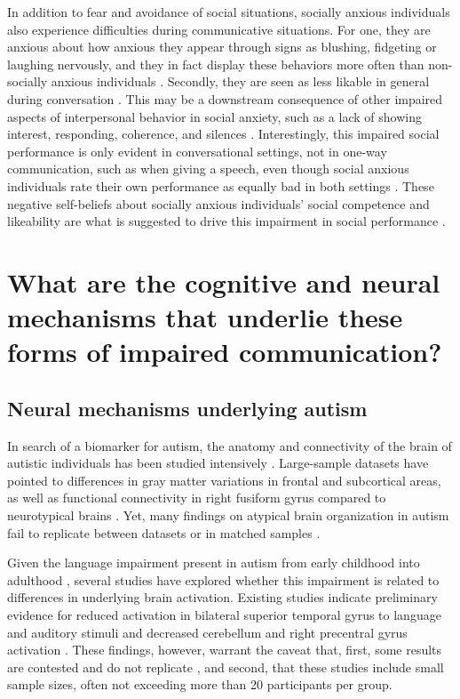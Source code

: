 In addition to fear and avoidance of social situations, socially anxious individuals also experience difficulties during communicative situations. For one, they are anxious about how anxious they appear through signs as blushing, fidgeting or laughing nervously, and they in fact display these behaviors more often than non-socially anxious individuals \citep{voncken2008JAD}. Secondly, they are seen as less likable in general during conversation \citep{alden1995,creed1998,meleshko1993,voncken2008BJCP}. This may be a downstream consequence of other impaired aspects of interpersonal behavior in social anxiety, such as a lack of showing interest, responding, coherence, and silences \citep{voncken2008JAD}. Interestingly, this impaired social performance is only evident in conversational settings, not in one-way communication, such as when giving a speech, even though social anxious individuals rate their own performance as equally bad in both settings \citep{voncken2008JAD}. These negative self-beliefs about socially anxious individuals’ social competence and likeability are what is suggested to drive this impairment in social performance \citep{voncken2010}.

\section{What are the cognitive and neural mechanisms that underlie these forms of impaired communication?}

\subsection{Neural mechanisms underlying autism}

In search of a biomarker for autism, the anatomy and connectivity of the brain of autistic individuals has been studied intensively \citep[for a review]{pretzsch2022}. Large-sample datasets have pointed to differences in gray matter variations in frontal and subcortical areas, as well as functional connectivity in right fusiform gyrus compared to neurotypical brains \citep{mei2020,oblong2023}. Yet, many findings on atypical brain organization in autism fail to replicate between datasets or in matched samples \citep{he2020,koldewyn2014,mei2024,riddle2017}. 

Given the language impairment present in autism from early childhood into adulthood \citep{velikonja2019}, several studies have explored whether this impairment is related to differences in underlying brain activation. Existing studies indicate preliminary evidence for reduced activation in bilateral superior temporal gyrus to language and auditory stimuli and decreased cerebellum and right precentral gyrus activation \citep[for reviews]{groen2008,philip2012}. These findings, however, warrant the caveat that, first, some results are contested and do not replicate \citep{tryfon2018}, and second, that these studies include small sample sizes, often not exceeding more than 20 participants per group.

